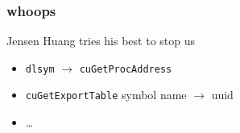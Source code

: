\documentclass{beamer}
\begin{document}
\begin{frame}
  \frametitle{whoops}
  \begin{alertblock}{Jensen Huang tries his best to stop us}
  \end{alertblock}
  \begin{itemize}
    \item \texttt{dlsym} $\rightarrow$ \texttt{cuGetProcAddress}
    \item \texttt{cuGetExportTable} symbol name $\rightarrow$ uuid
    \item \ldots
  \end{itemize}
\end{frame}
\end{document}
